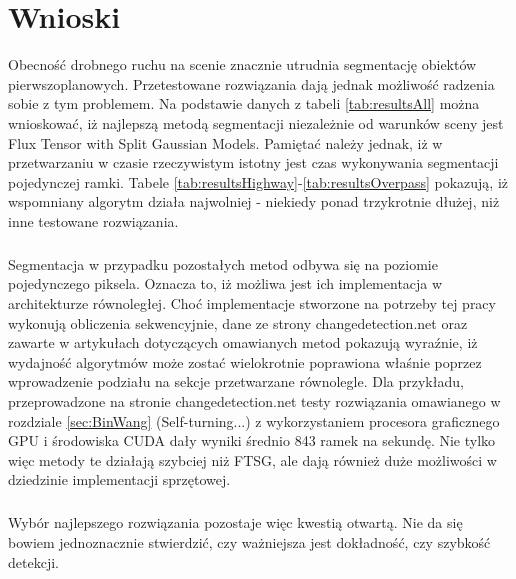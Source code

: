 \chapter{Wnioski}
\label{sec:wnioski}
Obecność drobnego ruchu na scenie znacznie utrudnia segmentację obiektów pierwszoplanowych. Przetestowane rozwiązania dają jednak możliwość radzenia sobie z tym problemem. Na podstawie danych z tabeli \ref{tab:resultsAll} można wnioskować, iż najlepszą metodą segmentacji niezależnie od warunków sceny jest Flux Tensor with Split Gaussian Models. Pamiętać należy jednak, iż w\,przetwarzaniu w czasie rzeczywistym istotny jest czas wykonywania segmentacji pojedynczej ramki. Tabele \ref{tab:resultsHighway}-\ref{tab:resultsOverpass} pokazują, iż wspomniany algorytm działa najwolniej - niekiedy ponad trzykrotnie dłużej, niż inne testowane rozwiązania.
\paragraph{}
Segmentacja w przypadku pozostałych metod odbywa się na poziomie pojedynczego piksela. Oznacza to, iż możliwa jest ich implementacja w architekturze równoległej. Choć implementacje stworzone na potrzeby tej pracy wykonują obliczenia sekwencyjnie, dane ze strony changedetection.net oraz zawarte w artykułach dotyczących omawianych metod pokazują wyraźnie, iż wydajność algorytmów może zostać wielokrotnie poprawiona właśnie poprzez wprowadzenie podziału na sekcje przetwarzane równolegle. Dla przykładu, przeprowadzone na stronie changedetection.net testy rozwiązania omawianego w rozdziale \ref{sec:BinWang} (Self-turning...) z wykorzystaniem procesora graficznego GPU i środowiska CUDA dały wyniki średnio 843 ramek na sekundę. Nie tylko więc metody te działają szybciej niż FTSG, ale dają również duże możliwości w\,dziedzinie implementacji sprzętowej.
\paragraph{}
Wybór najlepszego rozwiązania pozostaje więc kwestią otwartą. Nie da się bowiem jednoznacznie stwierdzić, czy ważniejsza jest dokładność, czy szybkość detekcji. 